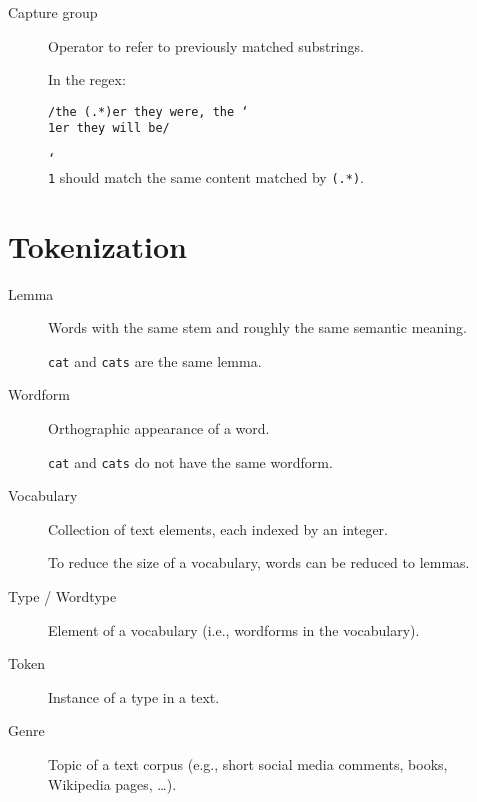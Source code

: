 \begin{description}
    \item[Capture group]
        Operator to refer to previously matched substrings.

        \begin{example}
            In the regex:
            \begin{center}
                \texttt{/the (.*)er they were, the \char`\\ 1er they will be/}
            \end{center}
            \texttt{\char`\\ 1} should match the same content matched by \texttt{(.*)}.
        \end{example}
\end{description}



\section{Tokenization}

\begin{description}
    \item[Lemma] 
        Words with the same stem and roughly the same semantic meaning.
        \begin{example}
            \texttt{cat} and \texttt{cats} are the same lemma.
        \end{example}

    \item[Wordform] 
        Orthographic appearance of a word.
        \begin{example}
            \texttt{cat} and \texttt{cats} do not have the same wordform.
        \end{example}
    
    \item[Vocabulary] 
        Collection of text elements, each indexed by an integer.

        \begin{remark}
            To reduce the size of a vocabulary, words can be reduced to lemmas.
        \end{remark}

    \item[Type / Wordtype] 
        Element of a vocabulary (i.e., wordforms in the vocabulary).
    
    \item[Token] 
        Instance of a type in a text.

    \item[Genre] 
        Topic of a text corpus (e.g., short social media comments, books, Wikipedia pages, \dots).
\end{description}

